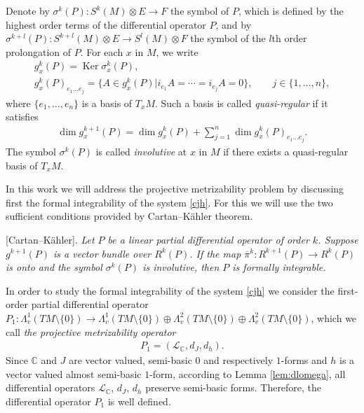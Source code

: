 \documentclass[pdftex]{sigma}
\numberwithin{equation}{section}
\begin{document}
Denote by $\sigma^k(P): S^k(M)\otimes E \to F$ the symbol of $P$,
which is def\/ined by the highest order terms of the dif\/ferential operator
$P$, and by $\sigma^{k+l}(P): S^{k+l}(M)\otimes E \to S^l(M)
\otimes F$ the symbol of the $l$th order prolongation of $P$. For
each $x$ in $M$, we write
\begin{gather*}
g^k_x(P) = \operatorname{Ker}\sigma^k_x(P),
\\ g^k_x(P)_{e_1\dots e_j}  =  \{A \in g^k_x(P)| i_{e_1}A=\cdots =
i_{e_j}A=0\},\qquad j\in \{1,\dots ,n\},
\end{gather*}
where  $\{e_1,\dots ,e_n\}$ is a basis of $T_xM$. Such a basis is
called \emph{quasi-regular} if it satisf\/ies
\begin{gather} \dim g^{k+1}_x(P)= \dim g^k_x(P) + \sum_{j=1}^n \dim
g^k_x(P)_{e_1\dots e_j}. \label{quasir}\end{gather} The symbol
$\sigma^k(P)$ is called \emph{involutive} at
$x$ in $M$ if there exists a quasi-regular basis of $T_xM$.

In this work we will address the projective metrizability problem by
discussing f\/irst the formal integrability of the system \eqref{cjh}. For
this we will use the two suf\/f\/icient conditions provided by
Cartan--K\"ahler theorem.

\medskip

 [Cartan--K\"ahler]. {\it Let $P$ be a linear partial
differential operator of order $k$. Suppose $g^{k+1}(P)$ is a
vector bundle over $R^k(P)$. If the map $\overline{\pi}^k:
R^{k+1}(P) \to R^k(P)$ is onto and the symbol $\sigma^k(P)$ is involutive, then
$P$ is formally integrable.}

\medskip

In order to study the formal integrability of the system
\eqref{cjh} we consider the f\/irst-order partial dif\/ferential operator $P_1:
\Lambda^1_v(TM\setminus\{0\}) \to \Lambda^1_v(TM\setminus\{0\})
\oplus \Lambda^2_v(TM\setminus\{0\}) \oplus
\Lambda^2_v(TM\setminus\{0\})$, which we call \emph{the projective
  metrizability operator}
\begin{gather}
\label{p1} P_1  = \left({\mathcal L}_{\mathbb C}, d_J, d_h
\right).
\end{gather}
Since $\mathbb{C} $ and $J$ are vector valued, semi-basic $0$ and
respectively $1$-forms and
$h$ is a vector valued almost semi-basic $1$-form,  according to Lemma \ref{lem:dlomega}, all dif\/ferential
operators $\mathcal{L}_{\mathbb{C}}$, $d_J$, $d_h$ preserve
semi-basic forms. Therefore, the dif\/ferential operator $P_1$ is well
def\/ined.
\end{document}

